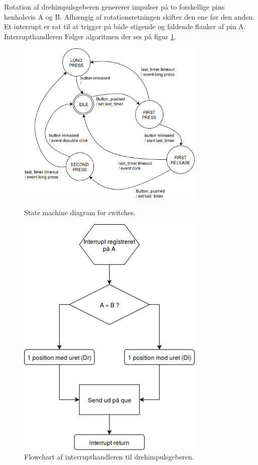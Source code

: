 Rotation af drehimpulsgeberen genererer impulser på to forskellige pins henholsvis A og B.
Afhængig af rotationsretningen skifter den ene før den anden. 
Et interrupt er sat til at trigger på både stigende og faldende flanker af pin A.
Interrupthandleren Følger algoritmen der ses på figur \ref{fig:digiFlow}.\newline
\begin{figure}[!ht]
	\centering
	\begin{minipage}[b]{0.50\textwidth}
		\centering 
		\includegraphics[width=0.8\textwidth]{billeder/buttons_statemachine.png}
		\newline 
		\caption{State machine diagram for switches. } 
		\label{fig:SW_statemachine}
	\end{minipage}\hfill
	\begin{minipage}[b]{0.50\textwidth}
		\centering 
		\includegraphics[width=0.8\textwidth]{billeder/digi_interrupt_flow.png} 
		\caption{Flowchart af interrupthandleren til drehimpulsgeberen. } 
		\label{fig:digiFlow} 
	\end{minipage}
\end{figure}
\pagebreak



